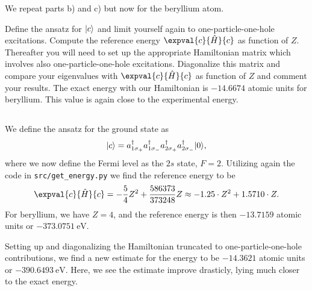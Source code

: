 We repeat parts b) and c) but now for the beryllium atom. %

Define the ansatz for $\lvert c\rangle$ and limit yourself again to one-particle-one-hole excitations.
Compute the reference energy $\expval{c}{\hat{H}}{c}$ as function of $Z$.
Thereafter you will need to set up the appropriate Hamiltonian matrix which involves also one-particle-one-hole excitations.
Diagonalize this matrix and compare your eigenvalues with $\expval{c}{\hat{H}}{c}$ as function of $Z$ and comment your results.
The exact energy with our Hamiltonian is $-14.6674$ atomic units for beryllium.
This value is again close to the experimental energy.

\subsection{}
We define the ansatz for the ground state as
\begin{equation}
    \lvert c\rangle = a^\dagger_{1\sigma_{+}} a^\dagger_{1\sigma_{-}} a^\dagger_{2\sigma_{+}} a^\dagger_{2\sigma_{-}} \lvert0\rangle,
\end{equation}
where we now define the Fermi level as the $2s$ state, $F = 2$.
Utilizing again the code in \verb|src/get_energy.py| we find the reference energy to be
\begin{equation}
    \expval{c}{\hat{H}}{c} = -\frac{5}{4} Z^2 + \frac{586373}{373248} Z \approx -1.25 \cdot Z^2 + 1.5710 \cdot Z.
\end{equation}
For beryllium, we have $Z = 4$, and the reference energy is then $-13.7159$ atomic units or $-373.0751 \ \text{eV}$.

Setting up and diagonalizing the Hamiltonian truncated to one-particle-one-hole contributions, we find a new estimate for the energy to be $-14.3621$ atomic units or $-390.6493 \ \text{eV}$.
Here, we see the estimate improve drasticly, lying much closer to the exact energy.

